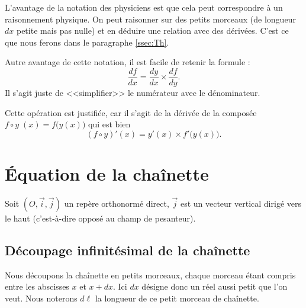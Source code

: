\documentclass[class=report,crop=false]{standalone}
\begin{document}
L'avantage de la notation des physiciens est que cela peut correspondre à un raisonnement physique.
On peut raisonner sur des petits morceaux (de longueur $dx$ petite mais pas nulle) et en déduire 
une relation avec des dérivées. C'est ce que nous ferons dans le paragraphe \ref{ssec:Th}.

Autre avantage de cette notation, il est facile de retenir la formule :
$$\frac{df}{dx} = \frac{dy}{dx}\times\frac{df}{dy}.$$
Il s'agit juste de <<simplifier>> le numérateur avec le dénominateur.

Cette opération est justifiée, car il s'agit de la dérivée de la composée $f \circ y \; (x) = f\big( y(x) \big)$
qui est bien 
$$\left(f \circ y \right)'(x) = y'(x) \times f'\big( y(x) \big).$$

\section{\'Equation de la chaînette}

Soit $(O,\vec i, \vec j)$ un repère orthonormé direct, $\vec j$ est un vecteur vertical
dirigé vers le haut (c'est-à-dire opposé au champ de pesanteur).

\subsection{Découpage infinitésimal de la chaînette}

Nous découpons la chaînette en petits morceaux, chaque morceau étant 
compris entre les abscisses $x$ et $x+dx$. Ici $dx$ désigne donc un
réel aussi petit que l'on veut.
Nous noterons $d\ell$ la longueur de ce petit morceau de chaînette.
\end{document}
